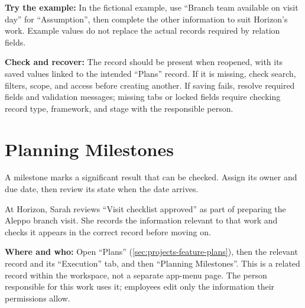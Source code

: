 \textbf{Try the example:} In the fictional example, use “Branch team available on visit day” for “Assumption”, then complete the other information to suit Horizon's work. Example values do not replace the actual records required by relation fields.

\textbf{Check and recover:} The record should be present when reopened, with its saved values linked to the intended “Plans” record. If it is missing, check search, filters, scope, and access before creating another. If saving fails, resolve required fields and validation messages; missing tabs or locked fields require checking record type, framework, and stage with the responsible person.

\clearpage
\section{Planning Milestones}
\label{sec:projects-feature-planning-milestones}

A milestone marks a significant result that can be checked. Assign its owner and due date, then review its state when the date arrives.

\begin{rcnote}
At Horizon, Sarah reviews “Visit checklist approved” as part of preparing the Aleppo branch visit. She records the information relevant to that work and checks it appears in the correct record before moving on.
\end{rcnote}

\textbf{Where and who:} Open “Plans” (\ref{sec:projects-feature-plans}), then the relevant record and its “Execution” tab, and then “Planning Milestones”. This is a related record within the workspace, not a separate app-menu page. The person responsible for this work uses it; employees edit only the information their permissions allow.

